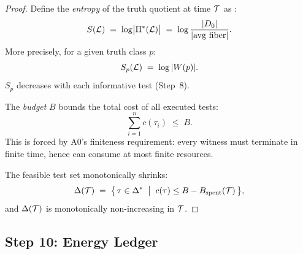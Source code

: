 \begin{proof}
Define the \emph{entropy} of the truth quotient at time $\mathcal{T}$ as \citep{shannon1948}:
\[
  S(\mathcal{L}) \;=\; \log \bigl|\Pi^*(\mathcal{L})\bigr|
    \;=\; \log \frac{|D_0|}{|\text{avg fiber}|}.
\]
More precisely, for a given truth class $p$:
\[
  S_p(\mathcal{L}) \;=\; \log |W(p)|.
\]
$S_p$ decreases with each informative test (Step~8).

The \emph{budget} $B$ bounds the total cost of all executed tests:
\[
  \sum_{i=1}^{n} c(\tau_i) \;\leq\; B.
\]
This is forced by A0's finiteness requirement: every witness must terminate
in finite time, hence can consume at most finite resources.

The feasible test set monotonically shrinks:
\[
  \Delta(\mathcal{T}) \;=\; \bigl\{\, \tau \in \Delta^* \;\bigm|\;
    c(\tau) \leq B - B_{\mathrm{spent}}(\mathcal{T}) \,\bigr\},
\]
and $\Delta(\mathcal{T})$ is monotonically non-increasing in $\mathcal{T}$.

\end{proof}


\subsection{Step 10: Energy Ledger}\label{app:step10}

